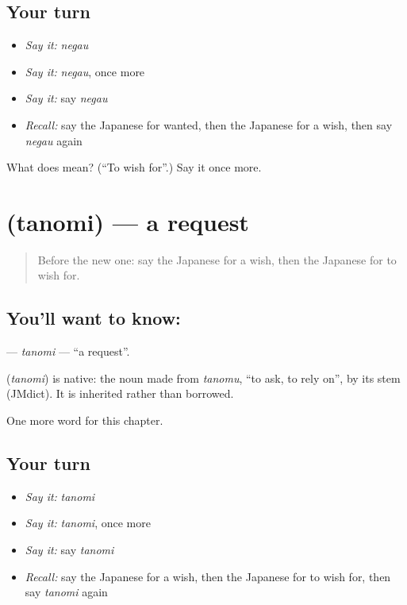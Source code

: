 \subsection*{Your turn}
\begin{itemize}
\raggedright
  \item \emph{Say it:} \emph{negau}
  \item \emph{Say it:} \emph{negau}, once more
  \item \emph{Say it:} say \emph{negau}
  \item \emph{Recall:} say the Japanese for wanted, then the Japanese for a wish, then say \emph{negau} again
\end{itemize}

\begin{tcolorbox}[breakable,colback=teal!4,colframe=teal!35!black,title={Before you move on}]
What does  mean? (\textquotedblleft{}To wish for\textquotedblright{}.) Say it once more.
\end{tcolorbox}
\section[\texorpdfstring{\ja{たのみ} (tanomi)}{たのみ (tanomi)}]{ (tanomi) — a request}

\label{lesson:JA-C92-tanomi}



\begin{quote}
Before the new one: say the Japanese for a wish, then the Japanese for to wish for.
\end{quote}

\subsection*{You'll want to know: }
\textbf{} — \emph{tanomi} — \textquotedblleft{}a request\textquotedblright{}.

\begin{cousinweb}
\textbf{} (\emph{tanomi}) is native: the noun made from \emph{tanomu}, \textquotedblleft{}to ask, to rely on\textquotedblright{}, by its stem (JMdict). It is inherited rather than borrowed.
\end{cousinweb}

\begin{grammarlens}[title={What you've built}]
One more word for this chapter.
\end{grammarlens}

\subsection*{Your turn}
\begin{itemize}
\raggedright
  \item \emph{Say it:} \emph{tanomi}
  \item \emph{Say it:} \emph{tanomi}, once more
  \item \emph{Say it:} say \emph{tanomi}
  \item \emph{Recall:} say the Japanese for a wish, then the Japanese for to wish for, then say \emph{tanomi} again
\end{itemize}

